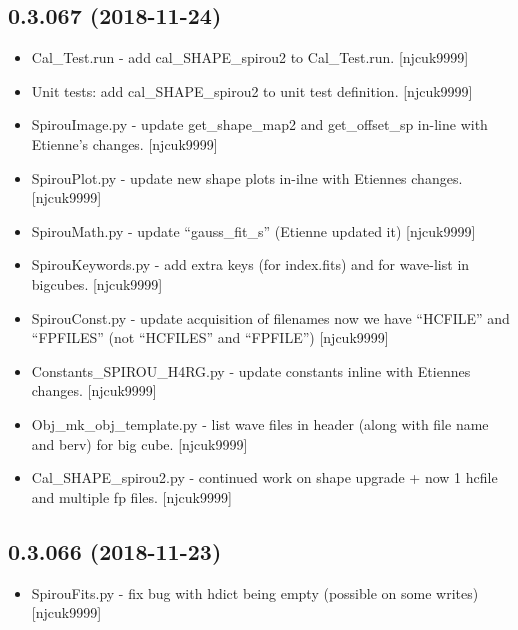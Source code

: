 \documentclass[a4paper,10pt,english]{report}
\begin{document}
\subsection{0.3.067 (2018-11-24)}
\label{\detokenize{misc/changelog:id254}}\begin{itemize}
\item {} 
Cal\_Test.run - add cal\_SHAPE\_spirou2 to Cal\_Test.run. {[}njcuk9999{]}

\item {} 
Unit tests: add cal\_SHAPE\_spirou2 to unit test definition. {[}njcuk9999{]}

\item {} 
SpirouImage.py - update get\_shape\_map2 and get\_offset\_sp in-line with
Etienne’s changes. {[}njcuk9999{]}

\item {} 
SpirouPlot.py - update new shape plots in-ilne with Etiennes changes.
{[}njcuk9999{]}

\item {} 
SpirouMath.py - update “gauss\_fit\_s” (Etienne updated it) {[}njcuk9999{]}

\item {} 
SpirouKeywords.py - add extra keys (for index.fits) and for wave-list
in bigcubes. {[}njcuk9999{]}

\item {} 
SpirouConst.py - update acquisition of filenames now we have “HCFILE”
and “FPFILES” (not “HCFILES” and “FPFILE”) {[}njcuk9999{]}

\item {} 
Constants\_SPIROU\_H4RG.py - update constants inline with Etiennes
changes. {[}njcuk9999{]}

\item {} 
Obj\_mk\_obj\_template.py - list wave files in header (along with file
name and berv) for big cube. {[}njcuk9999{]}

\item {} 
Cal\_SHAPE\_spirou2.py - continued work on shape upgrade + now 1 hcfile
and multiple fp files. {[}njcuk9999{]}

\end{itemize}


\subsection{0.3.066 (2018-11-23)}
\label{\detokenize{misc/changelog:id255}}\begin{itemize}
\item {} 
SpirouFits.py - fix bug with hdict being empty (possible on some
writes) {[}njcuk9999{]}

\end{itemize}
\end{document}
